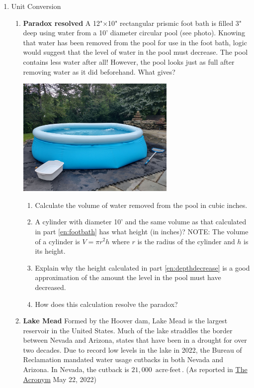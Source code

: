 \begin{enumerate}
\item Unit Conversion
\begin{enumerate}
	\item\textbf{Paradox resolved} A 12"$\times$10" rectangular prismic foot bath is filled 3" deep using water from a 10' diameter circular pool (see photo). Knowing that water has been removed from the pool for use in the foot bath, logic would suggest that the level of water in the pool must decrease. The pool contains less water after all! However, the pool looks just as full after removing water as it did beforehand. What gives?
	\begin{center}\includegraphics[width=3in]{images/pool}\end{center}
	\begin{enumerate}
		\item \label{en:footbath}Calculate the volume of water removed from the pool in cubic inches.
		\item \label{en:depthdecrease}A cylinder with diameter 10' and the same volume as that calculated in part \ref{en:footbath} has what height (in inches)? NOTE: The volume of a cylinder is $V=\pi r^2h$ where $r$ is the radius of the cylinder and $h$ is its height.
		\item Explain why the height calculated in part \ref{en:depthdecrease} is a good approximation of the amount the level in the pool must have decreased.
		\item How does this calculation resolve the paradox?
	\end{enumerate}
	\item\textbf{Lake Mead} Formed by the Hoover dam, Lake Mead is the largest reservoir in the United States. Much of the lake straddles the border between Nevada and Arizona, states that have been in a drought for over two decades. Due to record low levels in the lake in 2022, the Bureau of Reclamation mandated water usage cutbacks in both Nevada and Arizona. In Nevada, the cutback is $21,000$ $\text{acre}\cdot\text{feet}$. (As reported in \href{https://sites.imsa.edu/acronym/2022/05/22/the-drought-affecting-lake-mead/}{The Acronym} May 22, 2022)

\end{enumerate}
\end{enumerate}
